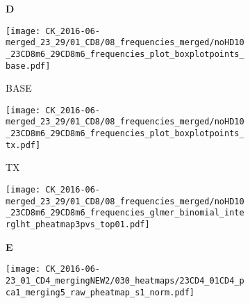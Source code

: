 \documentclass[a4paper, 12pt]{article}
\begin{document}
\begin{figure}[!thb]
\centering

    \caption{Frequencies CD8}
    \begin{subfigure}[t]{0.02\textwidth}
    \vskip 0pt
        \textbf{\textsf{\normalsize D}}
    \end{subfigure}
    \begin{subfigure}[t]{0.45\textwidth}
    \vskip 0pt
    \caption{BASE}
        \texttt{[image: CK\_2016-06-merged\_23\_29/01\_CD8/08\_frequencies\_merged/noHD10\_23CD8m6\_29CD8m6\_frequencies\_plot\_boxplotpoints\_base.pdf]}
    \end{subfigure}
    \quad
        \begin{subfigure}[t]{0.02\textwidth}
    \vskip 0pt
        \textbf{\textsf{\normalsize }}
    \end{subfigure}
    \begin{subfigure}[t]{0.45\textwidth}
    \vskip 0pt
    \caption{TX}
        \texttt{[image: CK\_2016-06-merged\_23\_29/01\_CD8/08\_frequencies\_merged/noHD10\_23CD8m6\_29CD8m6\_frequencies\_plot\_boxplotpoints\_tx.pdf]}
    \end{subfigure}

    \begin{subfigure}[t]{0.02\textwidth}
    \vskip 0pt
        \textbf{\textsf{\normalsize }}
    \end{subfigure}
    \begin{subfigure}[t]{0.5\textwidth}
    \vskip 0pt
    \caption{}
        \texttt{[image: CK\_2016-06-merged\_23\_29/01\_CD8/08\_frequencies\_merged/noHD10\_23CD8m6\_29CD8m6\_frequencies\_glmer\_binomial\_interglht\_pheatmap3pvs\_top01.pdf]}
    \end{subfigure}


\end{figure}


\begin{figure}[!thb]
\centering

    \caption{Heatmap - data 23 CD4}
    \begin{subfigure}[t]{0.02\textwidth}
    \vskip 0pt
        \textbf{\textsf{\normalsize E}}
    \end{subfigure}
    \begin{subfigure}[t]{0.97\textwidth}
    \vskip 0pt
    \caption{}
        \texttt{[image: CK\_2016-06-23\_01\_CD4\_mergingNEW2/030\_heatmaps/23CD4\_01CD4\_pca1\_merging5\_raw\_pheatmap\_s1\_norm.pdf]}
    \end{subfigure}
    
\end{figure}
\end{document}
